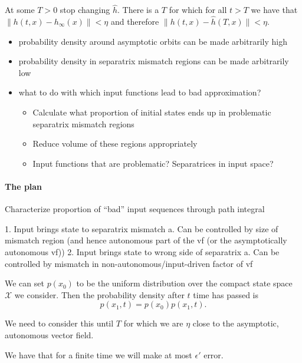 \documentclass{article}
\theoremstyle{definition} \newtheorem{definition}{Definition}
\theoremstyle{remark} \newtheorem{remark}{Remark}
\newcounter{ct}
\begin{document}
At some $T>0$ stop changing $\hat h.$ %
There is a $T$ for which for all $t>T$ we have that $\|h(t,x)-h_\infty(x)\|<\eta$ and therefore $\|h(t,x)-\hat h(T,x)\|<\eta$.



\begin{itemize}
\item probability density around asymptotic orbits can be made arbitrarily high
\item probability density in separatrix mismatch regions can be made arbitrarily low
\item what to do with which input functions lead to bad approximation?
\begin{itemize}
\item Calculate what proportion of initial states ends up in problematic separatrix mismatch regions
\item Reduce volume of these regions appropriately
\item Input functions that are problematic? Separatrices in input space?
\end{itemize}
\end{itemize}


\paragraph{The plan}
Characterize proportion of “bad” input sequences through path integral 

1. Input brings state to separatrix mismatch
    a. Can be controlled by size of mismatch region (and hence autonomous part of the vf (or the asymptotically autonomous vf))
2. Input brings state to wrong side of separatrix
    a. Can be controlled by mismatch in non-autonomous/input-driven factor of vf
    
We can set $p(x_0)$ to be the uniform distribution over the compact state space $\mathcal{X}$ we consider. 
Then the probability density after $t$ time has passed is
\begin{equation}\label{eq:init_path_density}
p(x_1,t) = p(x_0)p(x_1,t).
\end{equation}

We need to consider this until $T$ for which we are $\eta$ close to the asymptotic, autonomous vector field.

We have that for a finite time we will make at most $\epsilon'$ error. %
\end{document}
